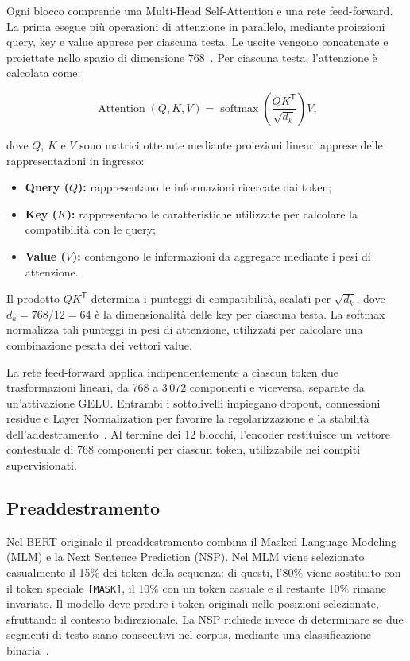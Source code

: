 \documentclass[12pt,a4paper]{report}
\begin{document}
Ogni blocco comprende una Multi-Head Self-Attention e una rete feed-forward. La prima esegue più operazioni di attenzione in parallelo, mediante proiezioni query, key e value apprese per ciascuna testa. Le uscite vengono concatenate e proiettate nello spazio di dimensione 768~\cite{vaswani2017}. Per ciascuna testa, l'attenzione è calcolata come:

\begin{equation}
\label{eq:scaled-dot-product-attention}
    \operatorname{Attention}(Q,K,V) =
    \operatorname{softmax}\!\left(
    \frac{QK^{\mathsf T}}{\sqrt{d_k}}
    \right)V,
\end{equation}

dove $Q$, $K$ e $V$ sono matrici ottenute mediante proiezioni lineari apprese delle rappresentazioni in ingresso:
\begin{itemize}
    \item \textbf{Query ($Q$):} rappresentano le informazioni ricercate dai token;
    \item \textbf{Key ($K$):} rappresentano le caratteristiche utilizzate per calcolare la compatibilità con le query;
    \item \textbf{Value ($V$):} contengono le informazioni da aggregare mediante i pesi di attenzione.
\end{itemize}

Il prodotto $QK^{\mathsf T}$ determina i punteggi di compatibilità, scalati per $\sqrt{d_k}$, dove $d_k=768/12=64$ è la dimensionalità delle key per ciascuna testa. La softmax normalizza tali punteggi in pesi di attenzione, utilizzati per calcolare una combinazione pesata dei vettori value.

La rete feed-forward applica indipendentemente a ciascun token due trasformazioni lineari, da 768 a 3\,072 componenti e viceversa, separate da un'attivazione GELU. Entrambi i sottolivelli impiegano dropout, connessioni residue e Layer Normalization per favorire la regolarizzazione e la stabilità dell'addestramento~\cite{devlin2019,vaswani2017}. Al termine dei 12 blocchi, l'encoder restituisce un vettore contestuale di 768 componenti per ciascun token, utilizzabile nei compiti supervisionati.

\subsection{Preaddestramento}
\label{subsec:pretraining}

Nel BERT originale il preaddestramento combina il Masked Language Modeling (MLM) e la Next Sentence Prediction (NSP). Nel MLM viene selezionato casualmente il 15\% dei token della sequenza: di questi, l'80\% viene sostituito con il token speciale \texttt{[MASK]}, il 10\% con un token casuale e il restante 10\% rimane invariato. Il modello deve predire i token originali nelle posizioni selezionate, sfruttando il contesto bidirezionale. La NSP richiede invece di determinare se due segmenti di testo siano consecutivi nel corpus, mediante una classificazione binaria~\cite{devlin2019}.
\end{document}
